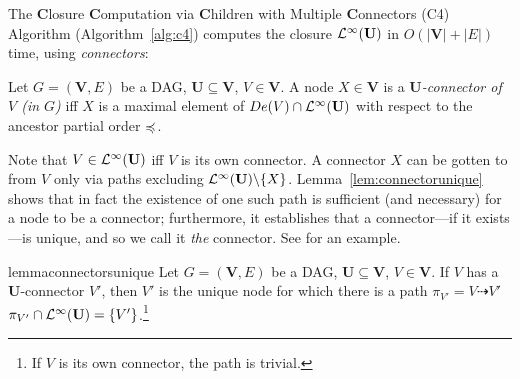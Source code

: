 The {\bf C}losure {\bf C}omputation via {\bf C}hildren with Multiple {\bf C}onnectors (C4) Algorithm (Algorithm~\ref{alg:c4}) computes the closure $\mathcal{L}^{\infty}(\mathbf{U})$ in $O(|\mathbf{V}|+|E|)$ time, using {\it connectors}:
\begin{definition}[Connector]\label{def:connector}
  Let $G=(\mathbf{V},E)$ be a DAG, $\mathbf{U} \subseteq \mathbf{V}$, $V \in \mathbf{V}$.
  A node $X \in \mathbf{V}$ is a \emph{$\mathbf{U}$-connector of $V$ (in $G$)} iff $X$ is a maximal element of $De(V) \cap \mathcal{L}^{\infty} (\mathbf{U})$ with respect to the ancestor partial order $\preccurlyeq$.%
\end{definition}
Note that $V \in \mathcal{L}^{\infty} (\mathbf{U})$ iff $V$ is its own connector. A connector $X$ can be gotten to from $V$ only via paths excluding $\mathcal{L}^{\infty} (\mathbf{U}) \backslash \{X\}$. Lemma~\ref{lem:connectorunique} shows that in fact the existence of one such path is sufficient (and necessary) for a node to be a connector; furthermore, it establishes that a connector---if it exists---is unique, and so we call it {\it the} connector.
See  for an example.
\begin{restatable}{lemma}{connectorsunique}
   \label{lem:connectorunique}
   Let $G=(\mathbf{V},E)$ be a DAG, $\mathbf{U} \subseteq \mathbf{V}$, $V \in \mathbf{V}$. If $V$ has a $\mathbf{U}$-connector $V'$, then $V'$ is the unique node for which there is a path $\pi_{V'}=V \dasharrow V'$ \suchthat $\pi_{V'} \cap \mathcal{L}^{\infty} (\mathbf{U})=\{V'\}$.\footnote{If $V$ is its own connector, the path is trivial.}
\end{restatable}
